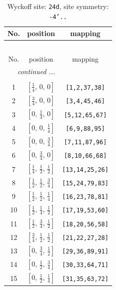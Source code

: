 \documentclass[fleqn,8pt]{jsarticle}
\begin{document}
\begin{longtable}{ccc}
\caption{Wyckoff site: {\tt 24d}, site symmetry: {\tt -4'..}}
 \\
 \hline \hline
No. & position & mapping \\ \hline \endfirsthead

\multicolumn{2}{l}{\tablename\ \thetable{}} \\
 \hline \hline
No. & position & mapping \\ \hline \endhead

 \hline \hline
\multicolumn{2}{r}{\footnotesize\it continued ...} \\ \endfoot

 \hline \hline
\multicolumn{2}{r}{} \\ \endlastfoot

1 & $\left[ \frac{1}{4},\, 0,\, 0 \right]$ & {\tt [1,2,37,38]} \\ \hline
2 & $\left[ \frac{3}{4},\, 0,\, 0 \right]$ & {\tt [3,4,45,46]} \\ \hline
3 & $\left[ 0,\, \frac{1}{4},\, 0 \right]$ & {\tt [5,12,65,67]} \\ \hline
4 & $\left[ 0,\, 0,\, \frac{1}{4} \right]$ & {\tt [6,9,88,95]} \\ \hline
5 & $\left[ 0,\, 0,\, \frac{3}{4} \right]$ & {\tt [7,11,87,96]} \\ \hline
6 & $\left[ 0,\, \frac{3}{4},\, 0 \right]$ & {\tt [8,10,66,68]} \\ \hline
7 & $\left[ \frac{1}{4},\, \frac{1}{2},\, \frac{1}{2} \right]$ & {\tt [13,14,25,26]} \\ \hline
8 & $\left[ \frac{1}{2},\, \frac{1}{2},\, \frac{3}{4} \right]$ & {\tt [15,24,79,83]} \\ \hline
9 & $\left[ \frac{1}{2},\, \frac{1}{2},\, \frac{1}{4} \right]$ & {\tt [16,23,78,81]} \\ \hline
10 & $\left[ \frac{1}{2},\, \frac{1}{4},\, \frac{1}{2} \right]$ & {\tt [17,19,53,60]} \\ \hline
11 & $\left[ \frac{1}{2},\, \frac{3}{4},\, \frac{1}{2} \right]$ & {\tt [18,20,56,58]} \\ \hline
12 & $\left[ \frac{3}{4},\, \frac{1}{2},\, \frac{1}{2} \right]$ & {\tt [21,22,27,28]} \\ \hline
13 & $\left[ 0,\, \frac{3}{4},\, \frac{1}{2} \right]$ & {\tt [29,36,89,91]} \\ \hline
14 & $\left[ 0,\, \frac{1}{2},\, \frac{3}{4} \right]$ & {\tt [30,33,64,71]} \\ \hline
15 & $\left[ 0,\, \frac{1}{2},\, \frac{1}{4} \right]$ & {\tt [31,35,63,72]} \\ \hline

\end{longtable}
\end{document}
